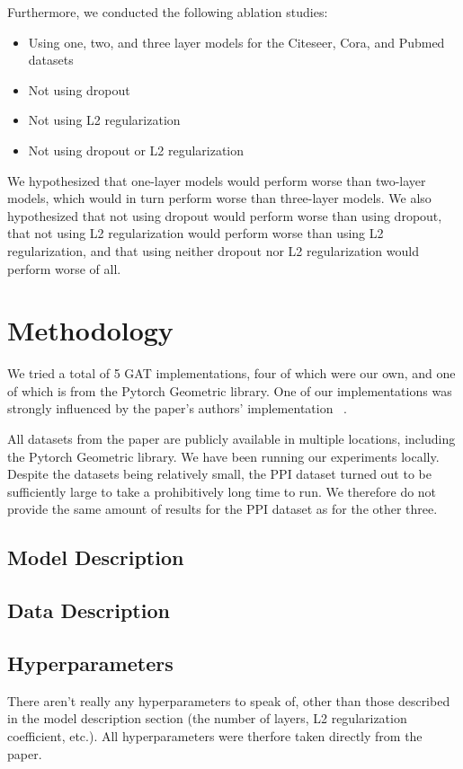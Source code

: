 \documentclass{article}
\begin{document}
    Furthermore, we conducted the following ablation studies:
    \begin{itemize}
        \item Using one, two, and three layer models for the Citeseer, Cora, and Pubmed datasets
	\item Not using dropout
	\item Not using L2 regularization
	\item Not using dropout or L2 regularization
    \end{itemize}
    We hypothesized that one-layer models would perform worse than two-layer models, which would in turn perform worse than three-layer models. We also hypothesized that not using dropout would perform worse than using dropout, that not using L2 regularization would perform worse than using L2 regularization, and that using neither dropout nor L2 regularization would perform worse of all.

    \section{Methodology}\label{sec:methodology}
    We tried a total of 5 GAT implementations, four of which were our own, and
    one of which is from the Pytorch Geometric library. One of our
    implementations was strongly influenced by the paper's authors'
    implementation ~\cite{petarvgatgithub}.

    All datasets from the paper are publicly available in multiple locations,
    including the Pytorch Geometric library. We have been running our
    experiments locally. Despite the datasets being relatively small, the PPI
    dataset turned out to be sufficiently large to take a prohibitively long
    time to run. We therefore do not provide the same amount of results for the
    PPI dataset as for the other three.

    \subsection{Model Description}\label{subsec:model-description}
    

    \subsection{Data Description}\label{subsec:data-description}
    

    \subsection{Hyperparameters}\label{subsec:hyperparameters}
    There aren't really any hyperparameters to speak of, other than those
    described in the model description section (the number of layers, L2
    regularization coefficient, etc.). All hyperparameters were therfore taken
    directly from the paper.
\end{document}
